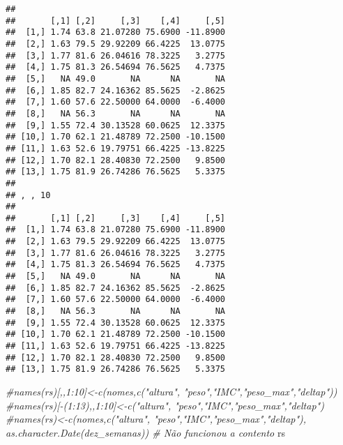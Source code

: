 \documentclass[]{article}
\newenvironment{Shaded}{\begin{snugshade}}{\end{snugshade}}
\newcommand{\CommentTok}[1]{\textcolor[rgb]{0.56,0.35,0.01}{\textit{#1}}}
\newcommand{\NormalTok}[1]{#1}
\begin{document}
\begin{verbatim}
## 
##       [,1] [,2]     [,3]    [,4]     [,5]
##  [1,] 1.74 63.8 21.07280 75.6900 -11.8900
##  [2,] 1.63 79.5 29.92209 66.4225  13.0775
##  [3,] 1.77 81.6 26.04616 78.3225   3.2775
##  [4,] 1.75 81.3 26.54694 76.5625   4.7375
##  [5,]   NA 49.0       NA      NA       NA
##  [6,] 1.85 82.7 24.16362 85.5625  -2.8625
##  [7,] 1.60 57.6 22.50000 64.0000  -6.4000
##  [8,]   NA 56.3       NA      NA       NA
##  [9,] 1.55 72.4 30.13528 60.0625  12.3375
## [10,] 1.70 62.1 21.48789 72.2500 -10.1500
## [11,] 1.63 52.6 19.79751 66.4225 -13.8225
## [12,] 1.70 82.1 28.40830 72.2500   9.8500
## [13,] 1.75 81.9 26.74286 76.5625   5.3375
## 
## , , 10
## 
##       [,1] [,2]     [,3]    [,4]     [,5]
##  [1,] 1.74 63.8 21.07280 75.6900 -11.8900
##  [2,] 1.63 79.5 29.92209 66.4225  13.0775
##  [3,] 1.77 81.6 26.04616 78.3225   3.2775
##  [4,] 1.75 81.3 26.54694 76.5625   4.7375
##  [5,]   NA 49.0       NA      NA       NA
##  [6,] 1.85 82.7 24.16362 85.5625  -2.8625
##  [7,] 1.60 57.6 22.50000 64.0000  -6.4000
##  [8,]   NA 56.3       NA      NA       NA
##  [9,] 1.55 72.4 30.13528 60.0625  12.3375
## [10,] 1.70 62.1 21.48789 72.2500 -10.1500
## [11,] 1.63 52.6 19.79751 66.4225 -13.8225
## [12,] 1.70 82.1 28.40830 72.2500   9.8500
## [13,] 1.75 81.9 26.74286 76.5625   5.3375
\end{verbatim}

\begin{Shaded}
\begin{Highlighting}[]
\CommentTok{#names(rs)[,,1:10]<-c(nomes,c("altura", "peso","IMC","peso_max","deltap"))}
\CommentTok{#names(rs)[-(1:13),,1:10]<-c("altura", "peso","IMC","peso_max","deltap")}
\CommentTok{#names(rs)<-c(nomes,c("altura", "peso","IMC","peso_max","deltap"), as.character.Date(dez_semanas)) # Não funcionou a contento}
\NormalTok{rs}
\end{Highlighting}
\end{Shaded}
\end{document}
